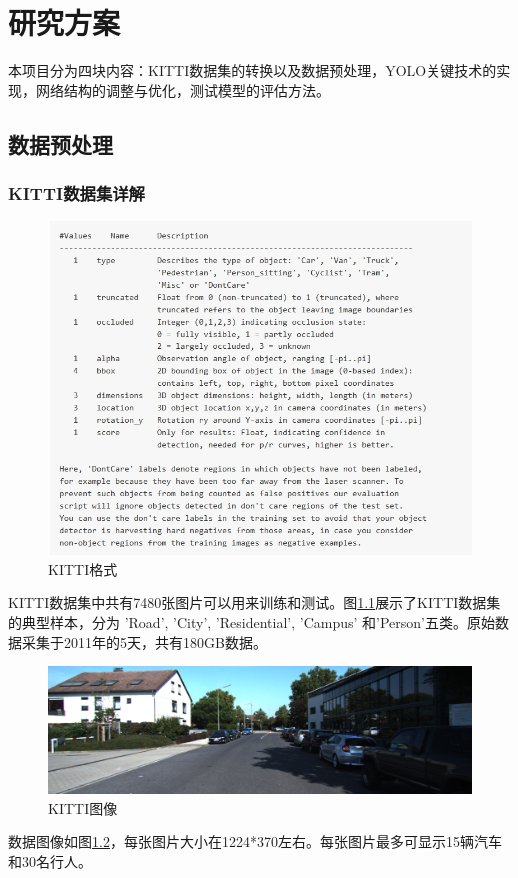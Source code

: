 \chapter{研究方案}
本项目分为四块内容：KITTI数据集的转换以及数据预处理，YOLO关键技术的实现，网络结构的调整与优化，测试模型的评估方法。
\section{数据预处理}{
	\subsection{KITTI数据集详解}
	\begin{figure}[htbp]
	\centering
	\includegraphics[width=5in]{images/KITTIForm.jpg}
	\caption{KITTI格式}
	\label{KITTIForm}
	\end{figure}
	KITTI数据集中共有7480张图片可以用来训练和测试。图\ref{KITTIForm}展示了KITTI数据集的典型样本，分为 ’Road’, ’City’, ’Residential’, ’Campus’ 和’Person’五类。原始数据采集于2011年的5天，共有180GB数据。

	\begin{figure}[htbp]
	\centering
	\includegraphics[width=5in]{images/007435.png}
	\caption{KITTI图像}
	\label{007435}
	\end{figure}
	数据图像如图\ref{007435}，每张图片大小在1224*370左右。每张图片最多可显示15辆汽车和30名行人。

}
